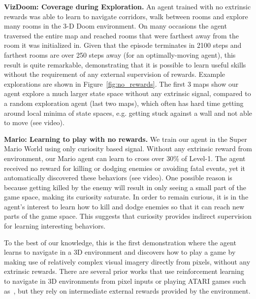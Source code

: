 \documentclass{article}
\begin{document}
{\bf VizDoom: Coverage during Exploration.}
An agent trained with no extrinsic rewards was able to learn to navigate corridors, walk between rooms and explore many rooms in the 3-D Doom environment. On many occasions the agent traversed the entire map and reached rooms that were farthest away from the room it was initialized in.
Given that the episode terminates in 2100 steps and farthest rooms are over 250 steps away (for an optimally-moving agent), this result is quite remarkable, demonstrating that it is possible to learn useful skills without the requirement of any external supervision of rewards.
Example explorations are shown in Figure~\ref{fig:no_rewards}. The first 3 maps show our agent explore a much larger state space without any extrinsic signal, compared to a random exploration agent (last two maps), which often has hard time getting around local minima of state spaces, e.g. getting stuck against a wall and not able to move (see video).

{\bf Mario: Learning to play with no rewards.}
We train our agent in the Super Mario World using only curiosity based signal.
Without any extrinsic reward from environment, our Mario agent can learn to cross over $30 \%$ of Level-1. The agent received no reward for killing or dodging enemies or avoiding fatal events, yet it automatically discovered these behaviors (see video). One possible reason is because getting killed by the enemy will result in only seeing a small part of the game space, making its curiosity saturate. In order to remain curious, it is in the agent's interest to learn how to kill and dodge enemies so that it can reach new parts of the game space. This suggests that curiosity provides indirect supervision for learning interesting behaviors.

To the best of our knowledge, this is the first demonstration where the agent learns to navigate in a 3D environment and discovers how to play a game by making use of relatively complex visual imagery directly from pixels, without any extrinsic rewards. There are several prior works that use reinforcement learning to navigate in 3D environments from pixel inputs or playing ATARI games such as~\cite{mnih2015human,mnih2016asynchronous,mirowski2016learning}, but they rely on intermediate external rewards provided by the environment.
\end{document}
